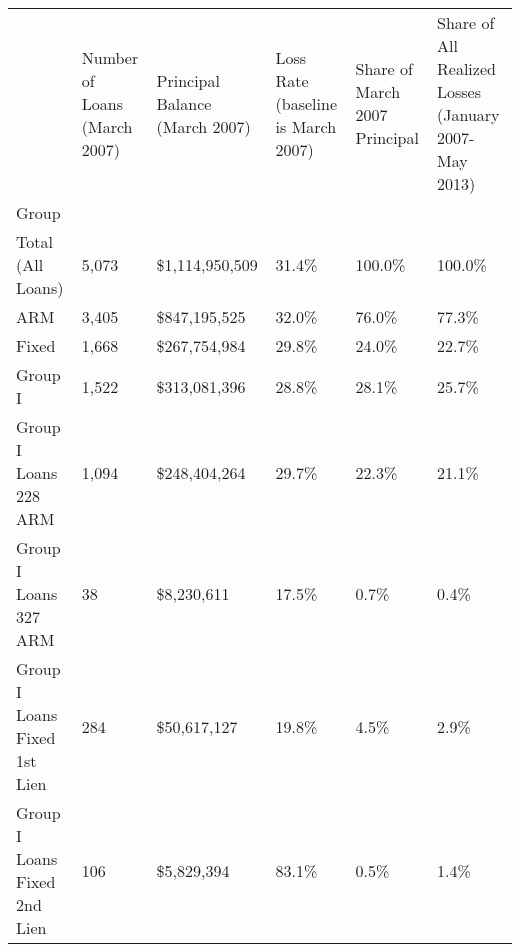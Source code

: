 \begin{tabular}{llllll}
\toprule
{} & Number of Loans (March 2007) & Principal Balance (March 2007) & Loss Rate (baseline is March 2007) & Share of March 2007 Principal & Share of All Realized Losses (January 2007-May 2013) \\
Group                                      &                              &                                &                                    &                               &                                                      \\
\midrule
Total (All Loans)                          &                        5,073 &                 \$1,114,950,509 &                              31.4\% &                        100.0\% &                                             100.0\% \\
ARM                                        &                        3,405 &                   \$847,195,525 &                              32.0\% &                         76.0\% &                                              77.3\% \\
Fixed                                      &                        1,668 &                   \$267,754,984 &                              29.8\% &                         24.0\% &                                              22.7\% \\
Group I                                    &                        1,522 &                   \$313,081,396 &                              28.8\% &                         28.1\% &                                              25.7\% \\
Group I Loans 228 ARM                      &                        1,094 &                   \$248,404,264 &                              29.7\% &                         22.3\% &                                              21.1\% \\
Group I Loans 327 ARM                      &                           38 &                     \$8,230,611 &                              17.5\% &                          0.7\% &                                               0.4\% \\
Group I Loans Fixed 1st Lien               &                          284 &                    \$50,617,127 &                              19.8\% &                          4.5\% &                                               2.9\% \\
Group I Loans Fixed 2nd Lien               &                          106 &                     \$5,829,394 &                              83.1\% &                          0.5\% &                                               1.4\% \\

\end{tabular}
